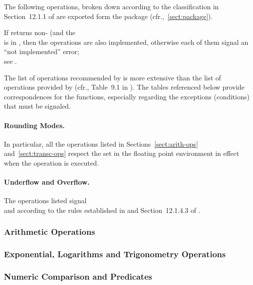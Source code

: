 \documentclass[../Floating-Point-Operations.tex]{subfiles}
\begin{document}
The following \CL{} operations, broken down according to the
classification in Section~12.1.1 of \cite{1996:ANSIHyperSpec} are exported
form the  package
(cfr.,~\ref{sect:package}).

If  returns non-
(and the\\
 is in
, then the operations are also implemented, otherwise
each of them signal an ``not implemented'' error;\\
see .

The list of operations
recommended by \cite{2008:IEEE-754} is more extensive than the list of
operations provided by \CL{} (cfr., Table~9.1 in \cite{2008:IEEE-754}).
%
The tables referenced below provide correspondences for the \CL{} functions,
especially regarding the exceptions (conditions) that must be
signaled.

\paragraph{Rounding Modes.} In particular, all the operations listed
in Sections~\ref{sect:arith-ops} and~\ref{sect:transc-ops} respect the
 set in the floating point
environment in effect when the operation is executed.

\paragraph{Underflow and Overflow.}  The operations listed signal
\\ and
 according to the rules established
in \cite{2008:IEEE-754} and Section~12.1.4.3 of \cite{1996:ANSIHyperSpec}.


\subsubsection{Arithmetic Operations}

\newpage

\subsubsection{Exponential, Logarithms and Trigonometry Operations}

\newpage

\subsubsection{Numeric Comparison and Predicates}

\end{document}
